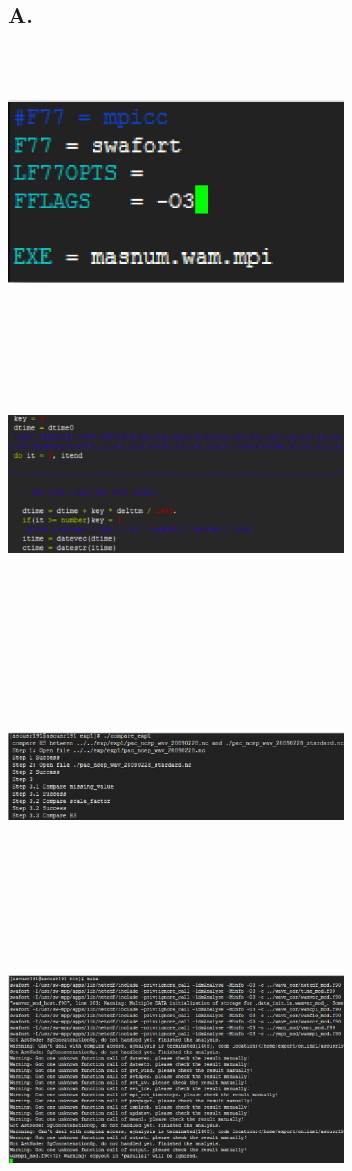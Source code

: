 \documentclass[conference,compsoc]{appendix/report}
\begin{document}
\subsection{A.}
\includegraphics[width=3.50in,height=3.00in]{appendix/q28.eps}
\includegraphics[width=3.50in,height=3.00in]{appendix/q22.eps}
\includegraphics[width=3.50in,height=3.00in]{appendix/q25.eps}
\includegraphics[width=3.50in,height=3.00in]{appendix/q26.eps}
\end{document}

